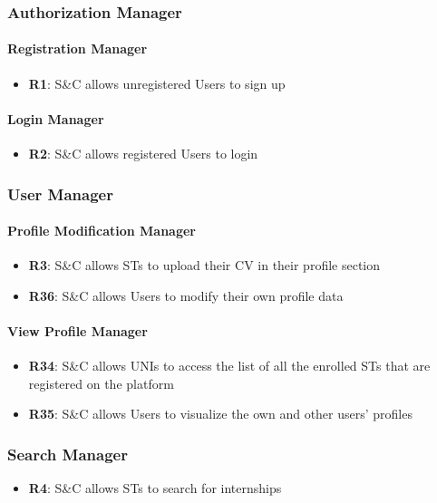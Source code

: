 \subsubsection{Authorization Manager}
\paragraph{Registration Manager}
\begin{itemize}
    \item \textbf{R1}: S\&C allows unregistered Users to sign up
\end{itemize}

\paragraph{Login Manager}
\begin{itemize}
    \item \textbf{R2}: S\&C allows registered Users to login
\end{itemize}


\subsubsection{User Manager}
\paragraph{Profile Modification Manager}
\begin{itemize}
    \item \textbf{R3}: S\&C allows STs to upload their CV in their profile section
    \item \textbf{R36}: S\&C allows Users to modify their own profile data
\end{itemize}

\paragraph{View Profile Manager}
\begin{itemize}
    \item \textbf{R34}: S\&C allows UNIs to access the list of all the enrolled STs that are registered on the platform
    \item \textbf{R35}: S\&C allows Users to visualize the own and other users' profiles
\end{itemize}


\subsubsection{Search Manager}
\begin{itemize}
    \item \textbf{R4}: S\&C allows STs to search for internships
\end{itemize}


